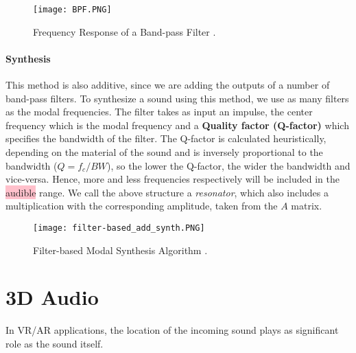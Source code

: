 \begin{figure}[H]
  \centering
    \texttt{[image: BPF.PNG]}
      \caption{Frequency Response of a Band-pass Filter  \cite{bib:bpf}.}
      \label{fig:resp_bpf}
\end{figure}

\paragraph{Synthesis\\}\label{par:synth}

This method is also additive, since we are adding the outputs of a number of band-pass filters. To synthesize a sound using this method, we use as many filters as the modal frequencies. The filter takes as input an impulse, the center frequency which is the modal frequency and a \textbf{Quality factor (Q-factor)} which specifies the bandwidth of the filter. The Q-factor is calculated heuristically, depending on the material of the sound and is inversely proportional to the bandwidth ($Q=f_c/BW$), so the lower the Q-factor, the wider the bandwidth and vice-versa. Hence, more and less frequencies respectively will be included in the \colorbox{pink}{audible} range. We call the above structure a \textit{resonator}, which also includes a multiplication with the corresponding amplitude, taken from the $A$ matrix.

\begin{figure}[H]
  \centering
    \texttt{[image: filter-based\_add\_synth.PNG]}
      \caption{Filter-based Modal Synthesis Algorithm \cite{Cook:2002:RSS:515316}.}
      \label{fig:filter_synth}
\end{figure}

\section{3D Audio}
In VR/AR applications, the location of the incoming sound plays as significant role as the sound itself. 

